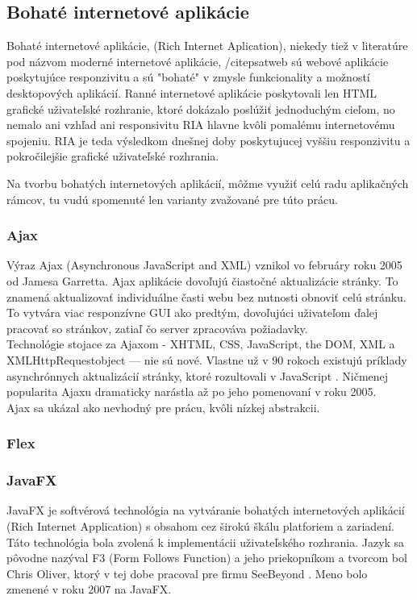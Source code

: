 \subsection{Bohaté internetové aplikácie}

Bohaté internetové aplikácie, (Rich Internet Aplication), niekedy tiež v literatúre pod názvom moderné internetové aplikácie, /cite{psatweb} sú webové aplikácie poskytujúce responzivitu a sú "bohaté" v zmysle funkcionality a možností desktopových aplikácií. Ranné internetové aplikácie poskytovali len HTML grafické uživateľské rozhranie, ktoré dokázalo poslúžiť jednoduchým cieľom, no nemalo ani vzhľad ani responsivitu RIA hlavne kvôli pomalému internetovému spojeniu. RIA je teda výsledkom dnešnej doby poskytujucej vyššiu responzivitu a pokročilejšie grafické uživateľské rozhrania.
\cite{deitel2008ajax}

Na tvorbu bohatých internetových aplikácií, môžme využiť celú radu aplikačných rámcov, tu vudú spomenuté len varianty zvažované pre túto prácu.

\subsubsection{Ajax}

Výraz Ajax (Asynchronous JavaScript and XML) vznikol vo februáry roku 2005 od Jamesa Garretta. Ajax aplikácie dovoľujú čiastočné aktualizácie stránky. To znamená aktualizovať individuálne časti webu bez nutnosti obnoviť celú stránku. To vytvára viac responzívne GUI ako predtým, dovoľujúci uživateľom ďalej pracovať so stránkov, zatiaľ čo server zpracováva požiadavky. \\

Technológie stojace za Ajaxom - XHTML, CSS, JavaScript, the DOM, XML a XMLHttpRequestobject — nie sú nové. Vlastne už v 90 rokoch existujú príklady asynchrónnych aktualizácií stránky, ktoré rozultovali v JavaScript \cite{deitel2008ajax}. Ničmenej popularita Ajaxu dramaticky narástla až po jeho pomenovaní v roku 2005. \\

Ajax sa ukázal ako nevhodný pre prácu, kvôli nízkej abstrakcii.

\subsubsection{Flex}

\subsubsection{JavaFX}
 JavaFX je softvérová technológia na vytváranie bohatých internetových aplikácií (Rich Internet Application) s obsahom cez širokú škálu platforiem a zariadení.
Táto technológia bola zvolená k implementácii uživateľského rozhrania. Jazyk sa pôvodne nazýval F3 (Form Follows Function) a jeho priekopníkom a tvorcom bol Chris Oliver, ktorý v tej dobe pracoval pre firmu SeeBeyond \cite{dea2011javafx}. Meno bolo zmenené v roku 2007 na JavaFX. \cite{anderson2009essential}

